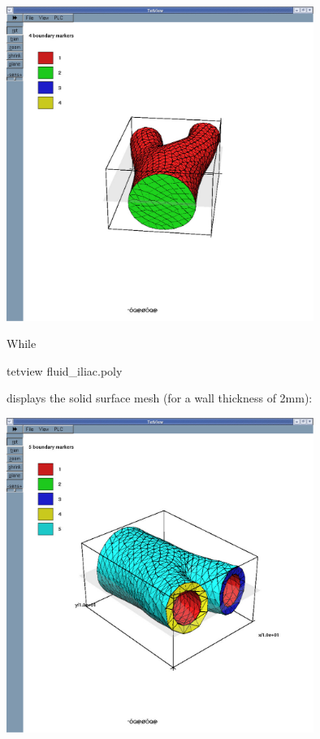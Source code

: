 \begin{DoxyImageNoCaption}
  \mbox{\includegraphics[width=0.75\textwidth]{fluid2}}
\end{DoxyImageNoCaption}


While 
\begin{DoxyCode}
tetview fluid\_iliac.poly
\end{DoxyCode}
 displays the solid surface mesh (for a wall thickness of 2mm)\+:

 
\begin{DoxyImageNoCaption}
  \mbox{\includegraphics[width=0.75\textwidth]{solid1}}
\end{DoxyImageNoCaption}
  
